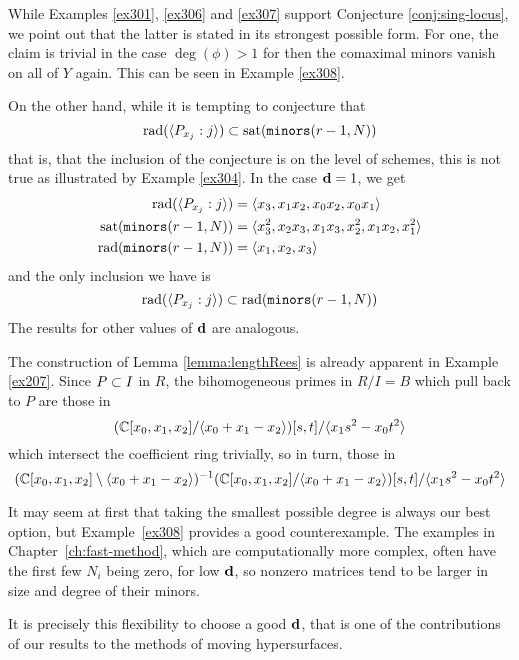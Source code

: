 \documentclass[fleqn,reqno]{amsart}
\begin{document}
\begin{example}[$\mt{ex315}$]
\label{ex315}
While Examples \ref{ex301}, \ref{ex306} and \ref{ex307} support Conjecture \ref{conj:sing-locus},
we point out that the latter is stated in its strongest possible form.
For one, the claim is trivial in the case $\deg(\phi)>1$
for then the comaximal minors vanish on all of $Y$ again.
This can be seen in Example \ref{ex308}.

On the other hand, while it is tempting to conjecture that
\[
	\operatorname{rad}(\langle P_{x_j}:j\rangle)\subset\operatorname{sat}(\mathop{\tt minors}(r-1,N))
\]
that is, that the inclusion of the conjecture is on the level of schemes,
this is not true as illustrated by Example \ref{ex304}.
In the case $\mathbf d=1$, we get
\begin{align*}
	\operatorname{rad}(\langle P_{x_j}:j\rangle)&=\langle {x}_{3},{x}_{1} {x}_{2},{x}_{0} {x}_{2},{x}_{0} {x}_{1}\rangle\\
	\operatorname{sat}(\mathop{\tt minors}(r-1,N))&=\langle{x}_{3}^{2},{x}_{2} {x}_{3},{x}_{1} {x}_{3},{x}_{2}^{2},{x}_{1}
      {x}_{2},{x}_{1}^{2}\rangle\\
	\operatorname{rad}(\mathop{\tt minors}(r-1,N))&=\langle {x}_{1},{x}_{2},{x}_{3}\rangle
\end{align*}
and the only inclusion we have is
\[
	\operatorname{rad}(\langle P_{x_j}:j\rangle)\subset\operatorname{rad}(\mathop{\tt minors}(r-1,N))
\]
The results for other values of $\mathbf d$ are analogous.
\end{example}

\begin{example}[316]
\label{ex316}
The construction of Lemma \ref{lemma:lengthRees} is already apparent in Example \ref{ex207}.
Since $P\subset I$ in $R$, the bihomogeneous primes in $R/I=B$
which pull back to $P$ are those in
\[
	(\mathbb{C}[x_0,x_1,x_2]/\langle x_0+x_1-x_2\rangle)[s,t]/\langle x_1s^2-x_0t^2\rangle
\]
which intersect the coefficient ring trivially, so in turn, those in
\[
	(\mathbb{C}[x_0,x_1,x_2]\setminus\langle x_0+x_1-x_2\rangle)^{-1}(\mathbb{C}[x_0,x_1,x_2]/\langle x_0+x_1-x_2\rangle)[s,t]/\langle x_1s^2-x_0t^2\rangle
\]
\end{example}

\begin{example}[317]
\label{ex317}
It may seem at first that taking the smallest possible degree is always our best option,
but Example~\ref{ex308} provides a good counterexample.
The examples in Chapter~\ref{ch:fast-method}, which are computationally more complex,
often have the first few $N_i$ being zero, for low $\mathbf d$,
so nonzero matrices tend to be larger in size and degree of their minors.

It is precisely this flexibility to choose a good $\mathbf d$,
that is one of the contributions of
our results to the methods of moving hypersurfaces.
\end{example}





\end{document}
